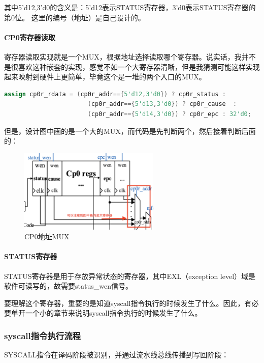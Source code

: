 \documentclass[a4paper]{article}
\begin{document}
其中5'd12,3'd0的含义是：5'd12表示STATUS寄存器，3'd0表示STATUS寄存器的第0位。 这里的编号（地址）是自己设计的。

\paragraph{CP0寄存器读取} 寄存器读取实现就是一个MUX，根据地址选择读取哪个寄存器。说实话，我并不是很喜欢这种嵌套的实现，感觉不如一个大寄存器清晰，但是我猜测可能这样实现起来映射到硬件上更简单，毕竟这个是一堆的两个入口的MUX。

\begin{lstlisting}[language=Verilog]
    assign cp0r_rdata = (cp0r_addr=={5'd12,3'd0}) ? cp0r_status :
                       (cp0r_addr=={5'd13,3'd0}) ? cp0r_cause  :
                       (cp0r_addr=={5'd14,3'd0}) ? cp0r_epc : 32'd0;
\end{lstlisting}

但是，设计图中画的是一个大的MUX，而代码是先判断两个，然后接着判断后面的：

\begin{figure}[H]
    \centering
    \includegraphics[width=0.6\textwidth]{img/复现流水线/cp0地址mux.png}
    \caption{CP0地址MUX}
\end{figure}


\paragraph{STATUS寄存器} STATUS寄存器是用于存放异常状态的寄存器，其中EXL（exception level）域是软件可读写的，故需要status\_wen信号。

要理解这个寄存器，重要的是知道syscall指令执行的时候发生了什么。因此，有必要单开一个小的章节来说明syscall指令执行的时候发生了什么。


\subsubsection{syscall指令执行流程}

SYSCALL指令在译码阶段被识别，并通过流水线总线传播到写回阶段：
\end{document}
